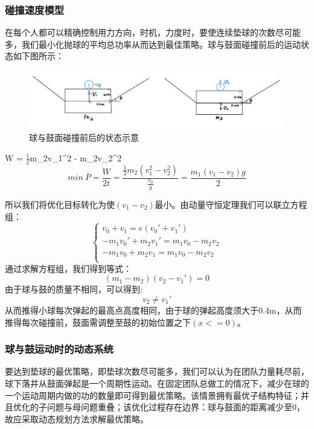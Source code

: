 \documentclass[withoutpreface,bwprint]{cumcmthesis}
\begin{document}
\subsubsection{碰撞速度模型}
在每个人都可以精确控制用力方向，时机，力度时，要使连续垫球的次数尽可能多，我们最小化抛球的平均总功率从而达到最佳策略。球与鼓面碰撞前后的运动状态如下图所示：
\begin{figure}[H]
	\centering
	\includegraphics[scale = 0.23]{IMG_0011.jpg}
	\caption{球与鼓面碰撞前后的状态示意}
\end{figure}

\begin{center}
	W = $\frac{1}{2}$m_2v_1^2 - m_2v_2^2\\
	$$min\ \overline{P} = \frac{W}{2t} = \frac{\frac{1}{2}m_2\left(v_1^2 - v_2^2\right)}{\frac{v_0}{g}} = \frac{m_1\left(v_1 - v_2\right)g}{2}$$
\end{center}
所以我们将优化目标转化为使$\left(v_1 - v_2\right)$最小。由动量守恒定理我们可以联立方程组：
\begin{equation}
	\begin{cases}
		v_0 + v_1 = e (v_0' + v_1')\\
		-m_1v_0' + m_2v_1' = m_1v_0 - m_2v_2\\
		-m_1v_0 + m_2v_1 = m_1v_0 - m_2v_2 \\
	\end{cases}	
\end{equation}
通过求解方程组，我们得到等式：
\[\left(m_1 - m_2\right)\left(v_2 - v_1'\right) = 0 \]
由于球与鼓的质量不相同，可以得到: \[v_2 \not= v_1'\]从而推得小球每次弹起的最高点高度相同，由于球的弹起高度须大于0.4m，从而推得每次碰撞前，鼓面需调整至鼓的初始位置之下$\left(x <= 0\right)$。

\subsubsection{球与鼓运动时的动态系统}
要达到垫球的最优策略，即垫球次数尽可能多，我们可以认为在团队力量耗尽前，球下落并从鼓面弹起是一个周期性运动。在固定团队总做工的情况下，减少在球的一个运动周期内做的功的数量即可得到最优策略。该情景拥有最优子结构特征；并且优化的子问题与母问题重叠；该优化过程存在边界：球与鼓面的距离减少至0，故应采取动态规划方法求解最优策略。
\end{document}
